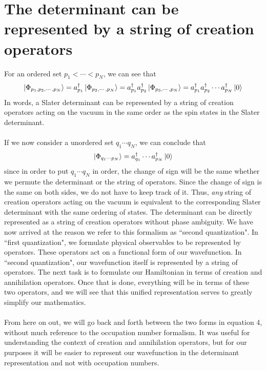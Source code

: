 \documentclass{article}
\begin{document}
\section{The determinant can be represented by a string of creation operators}

For an ordered set $p_1 < \cdots  < p_N$,
we can see that 
\[\ket{\Phi_{p_1, p_2, \cdots, p_N}} = a_{p_1}^\dagger \ket{\Phi_{p_2, \cdots, p_N}} = a_{p_1}^\dagger a_{p_2}^\dagger \ket{\Phi_{p_3, \cdots, p_N}}=
 a_{p_1}^\dagger a_{p_2}^\dagger \cdots a_{p_N}^\dagger \ket{0}\]
In words, a Slater determinant can be represented by a string of creation operators acting on the vacuum in the same order as the spin states in the Slater determinant. \\ \\
If we now consider a unordered set $q_1 \cdots q_N$, we can conclude that 
\begin{equation}\ket{\Phi_{q_1 \cdots p_N}} = a_{q_1}^\dagger \cdots a_{p_N}^\dagger \ket{0}\end{equation}
since in order to put $q_1 \cdots q_N$ in order, the change of sign will be the same whether we permute the determinant or the string of operators. 
Since the change of sign is the same on both sides, we do not have to keep track of it. 
Thus, \textit{any} string of creation operators acting on the vacuum is equivalent to the corresponding Slater determinant with the same ordering of states. 
The determinant can be directly represented as a string of creation operators without phase ambiguity.
We have now arrived at the reason we refer to this formalism as ``second quantization".
In ``first quantization", we formulate physical observables to be represented by operators.
These operators act on a functional form of our wavefunction. 
In ``second quantization", our wavefunction itself is represented by a string of operators. 
The next task is to formulate our Hamiltonian in terms of creation and annihilation operators. 
Once that is done, everything will be in terms of these two operators, and we will see that this unified representation serves to greatly simplify our mathematics.  \\
\\
From here on out, we will go back and forth between the two forms in equation 4, without much reference to the occupation number formalism. 
It was useful for understanding the context of creation and annihilation operators, but for our purposes it will be easier to represent our wavefunction in the determinant representation
and not with occupation numbers. 
\end{document}
